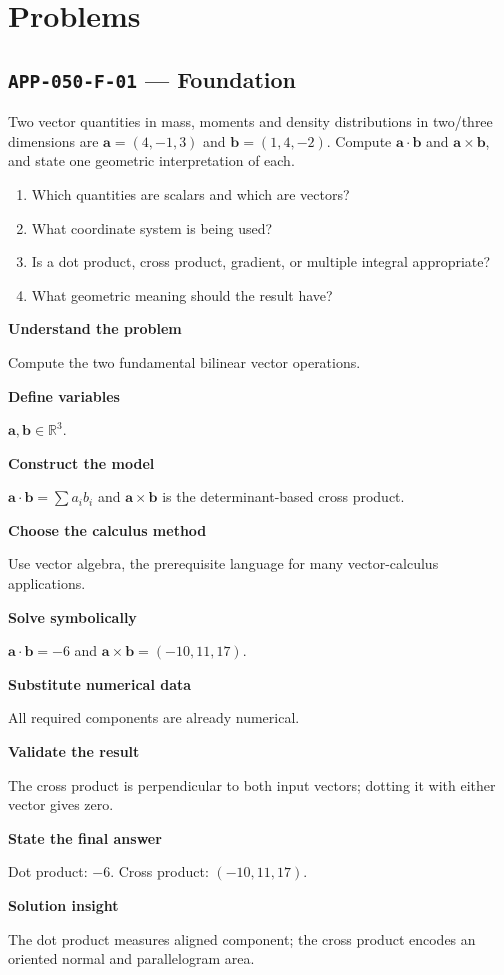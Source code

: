 \documentclass[11pt]{book}
\newcommand{\pid}[1]{\texttt{#1}}
\begin{document}
\section*{Problems}
\subsection*{\pid{APP-050-F-01} — Foundation}
\begin{problembox}
Two vector quantities in mass, moments and density distributions in two/three dimensions are $\mathbf a=(4,-1,3)$ and $\mathbf b=(1,4,-2)$. Compute $\mathbf a\cdot\mathbf b$ and $\mathbf a\times\mathbf b$, and state one geometric interpretation of each.
\end{problembox}
\begin{promptbox}\begin{enumerate}
\item Which quantities are scalars and which are vectors?
\item What coordinate system is being used?
\item Is a dot product, cross product, gradient, or multiple integral appropriate?
\item What geometric meaning should the result have?
\end{enumerate}\end{promptbox}
\begin{solutionbox}
\textbf{Understand the problem}\par Compute the two fundamental bilinear vector operations.\par\medskip
\textbf{Define variables}\par $\mathbf a,\mathbf b\in\mathbb R^3$.\par\medskip
\textbf{Construct the model}\par $\mathbf a\cdot\mathbf b=\sum a_ib_i$ and $\mathbf a\times\mathbf b$ is the determinant-based cross product.\par\medskip
\textbf{Choose the calculus method}\par Use vector algebra, the prerequisite language for many vector-calculus applications.\par\medskip
\textbf{Solve symbolically}\par $\mathbf a\cdot\mathbf b=-6$ and $\mathbf a\times\mathbf b=(-10,11,17)$.\par\medskip
\textbf{Substitute numerical data}\par All required components are already numerical.\par\medskip
\textbf{Validate the result}\par The cross product is perpendicular to both input vectors; dotting it with either vector gives zero.\par\medskip
\textbf{State the final answer}\par Dot product: $-6$. Cross product: $(-10,11,17)$.\par\medskip
\textbf{Solution insight}\par The dot product measures aligned component; the cross product encodes an oriented normal and parallelogram area.\par\medskip
\end{solutionbox}
\end{document}
